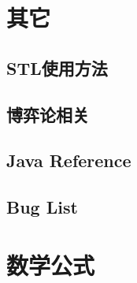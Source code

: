 \documentclass[landscape, oneside, a4paper, cs4size]{book}
\begin{document}
\begin{multicols}{2}
		\chapter{其它}
			\section{STL使用方法}
				\begin{spacing}{0.8}
				
				\end{spacing}
			\section{博弈论相关}
				\begin{spacing}{0.8}
				
				\end{spacing}
			\section{Java Reference}
				\begin{spacing}{0.8}
				
				\end{spacing}
			\section{Bug List}
				\begin{spacing}{0.8}
				
				\end{spacing}
		\chapter{数学公式}
			\begin{spacing}{0.8}
			
			\end{spacing}
	\end{multicols}
\end{document}

